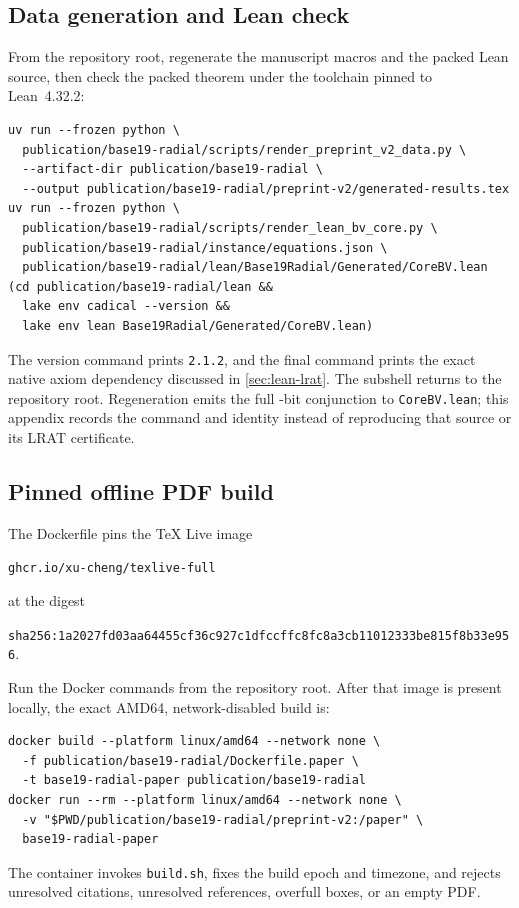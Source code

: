 \documentclass[11pt,twoside]{article}
\theoremstyle{remark}
\begin{document}
\subsection{Data generation and Lean check}

From the repository root, regenerate the manuscript macros and the packed
Lean source, then check the packed theorem under the toolchain pinned to
Lean~4.32.2:
{\small
\begin{verbatim}
uv run --frozen python \
  publication/base19-radial/scripts/render_preprint_v2_data.py \
  --artifact-dir publication/base19-radial \
  --output publication/base19-radial/preprint-v2/generated-results.tex
uv run --frozen python \
  publication/base19-radial/scripts/render_lean_bv_core.py \
  publication/base19-radial/instance/equations.json \
  publication/base19-radial/lean/Base19Radial/Generated/CoreBV.lean
(cd publication/base19-radial/lean &&
  lake env cadical --version &&
  lake env lean Base19Radial/Generated/CoreBV.lean)
\end{verbatim}
}
The version command prints \texttt{2.1.2}, and the final command prints the
exact native axiom dependency discussed in \cref{sec:lean-lrat}.  The
subshell returns to the repository root.  Regeneration emits the full \PackedWidth-bit
conjunction to \texttt{CoreBV.lean}; this appendix records the command and
identity instead of reproducing that source or its LRAT certificate.

\subsection{Pinned offline PDF build}

The Dockerfile pins the TeX Live image
\begin{center}
  \nolinkurl{ghcr.io/xu-cheng/texlive-full}
\end{center}
at the digest
\begin{center}
  \nolinkurl{sha256:1a2027fd03aa64455cf36c927c1dfccffc8fc8a3cb11012333be815f8b33e956}.
\end{center}
\begin{samepage}
Run the Docker commands from the repository root.  After that image is present
locally, the exact AMD64, network-disabled build is:
{\small
\begin{verbatim}
docker build --platform linux/amd64 --network none \
  -f publication/base19-radial/Dockerfile.paper \
  -t base19-radial-paper publication/base19-radial
docker run --rm --platform linux/amd64 --network none \
  -v "$PWD/publication/base19-radial/preprint-v2:/paper" \
  base19-radial-paper
\end{verbatim}
}
\end{samepage}
The container invokes \texttt{build.sh}, fixes the build epoch and timezone,
and rejects unresolved citations, unresolved references, overfull boxes, or
an empty PDF.

{\small


}
\end{document}
